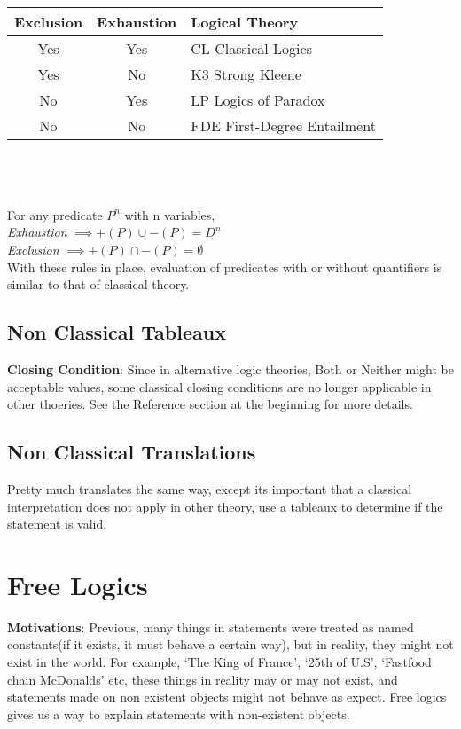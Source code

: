 \documentclass{article}
\begin{document}
\begin{tabular}{c | c| l}
    \hline
    Exclusion & Exhaustion & Logical Theory\\
    \hline
    Yes & Yes & CL Classical Logics\\
    
    Yes & No & K3 Strong Kleene\\
    No & Yes & LP Logics of Paradox \\
    No & No & FDE First-Degree Entailment\\
    \hline
    
\end{tabular}\\  \\ \\

\noindent For any predicate $P^n$ with n variables, \\
\emph{Exhaustion} $\implies +(P) \cup -(P) = D^n$\\
\emph{Exclusion} $\implies +(P) \cap  -(P) = \emptyset$\\
With these rules in place, evaluation of predicates with or without quantifiers is similar to that of classical theory. 


\subsection{Non Classical Tableaux}

\textbf{Closing Condition}: Since in alternative logic theories, Both 
or Neither might be acceptable values, some classical closing conditions are no longer applicable in other thoeries. See the Reference section at the
beginning for more details.

\subsection{Non Classical Translations}
Pretty much translates the same way, except its important that a classical
interpretation does not apply in other theory, use a tableaux to determine if the statement 
is valid.


\newpage
\section{Free Logics} 
\large
\textbf{Motivations}: Previous, many things in statements were treated as named constants(if it exists, it must behave a certain way), but 
in reality, they might not exist in the world. For example, `The King of France', `25th of U.S', 
`Fastfood chain McDonalds' etc, these things in reality may or may not exist, and statements made on 
non existent objects might not behave as expect. Free logics gives us a way to explain statements with non-existent objects.\\\\
\end{document}
